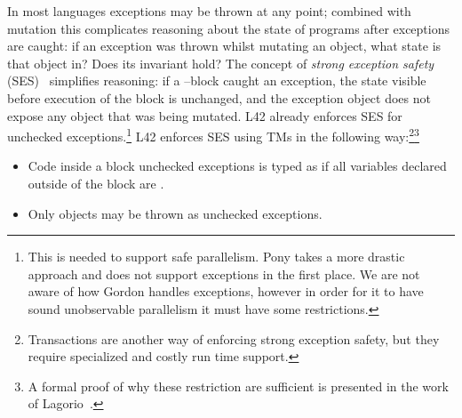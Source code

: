 {}\label{s:exceptions}
In most languages exceptions may be thrown at any point; combined with mutation this complicates reasoning about the state of programs after exceptions are caught: if an exception was thrown whilst mutating an object, what state is that object in? Does its invariant hold?
The concept of \emph{strong exception safety} (SES)~\cite{Abrahams2000,JOT:issue_2011_01/article1} simplifies reasoning:
if a \Q@try@--\Q@catch@ block caught an exception, the state visible before execution of the \Q@try@ block is unchanged, and the exception object does not expose any object that was being mutated.
L42 already enforces SES for unchecked exceptions.\footnote{%
This is needed to support safe parallelism. Pony takes a more drastic approach and does not support exceptions in the first place. 
We are not aware of how Gordon \etal handles exceptions, however in order for it to have sound unobservable parallelism it must have some restrictions.%
}
L42 enforces SES using TMs in the following way:\footnote{Transactions are another way of enforcing strong exception safety, but they require specialized and costly run time support.}\footnote{A formal proof of why these restriction are sufficient is presented in the work of Lagorio~\cite{JOT:issue_2011_01/article1}.}
\begin{itemize}
\item Code inside a \Q@try@ block   unchecked exceptions is typed as if all \Q@mut@ variables declared outside of the block are \Q@read@.
\item Only \Q@imm@ objects may be thrown as unchecked exceptions.
\end{itemize} 
